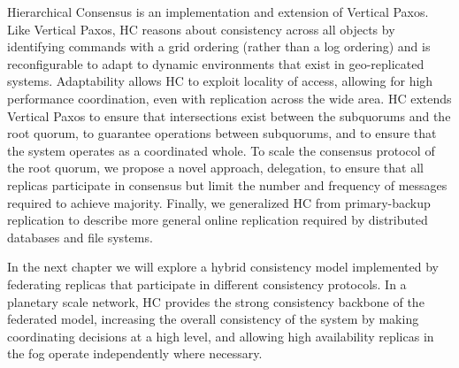 Hierarchical Consensus is an implementation and extension of Vertical Paxos.
Like Vertical Paxos, HC reasons about consistency across all objects by identifying commands with a grid ordering (rather than a log ordering) and is reconfigurable to adapt to dynamic environments that exist in geo-replicated systems.
Adaptability allows HC to exploit locality of access, allowing for high performance coordination, even with replication across the wide area.
HC extends Vertical Paxos to ensure that intersections exist between the subquorums and the root quorum, to guarantee operations between subquorums, and to ensure that the system operates as a coordinated whole.
To scale the consensus protocol of the root quorum, we propose a novel approach, delegation, to ensure that all replicas participate in consensus but limit the number and frequency of messages required to achieve majority.
Finally, we generalized HC from primary-backup replication to describe more general online replication required by distributed databases and file systems.

In the next chapter we will explore a hybrid consistency model implemented by federating replicas that participate in different consistency protocols.
In a planetary scale network, HC provides the strong consistency backbone of the federated model, increasing the overall consistency of the system by making coordinating decisions at a high level, and allowing high availability replicas in the fog operate independently where necessary.
